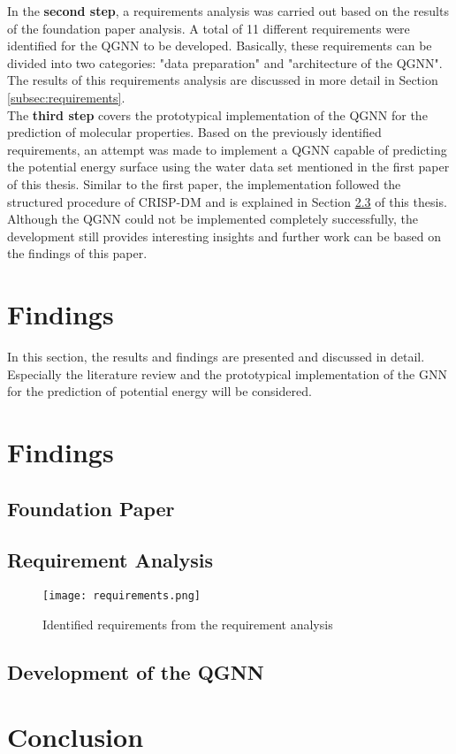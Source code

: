 In the \textbf{second step},  a requirements analysis was carried out based on the results of the foundation paper analysis. A total of 11 different requirements were identified for the QGNN to be developed. Basically, these requirements can be divided into two categories: "data preparation" and "architecture of the QGNN". The results of this requirements analysis are discussed in more detail in Section \ref{subsec:requirements}. \\

The \textbf{third step} covers the prototypical implementation of the QGNN for the prediction of molecular properties. Based on the previously identified requirements, an attempt was made to implement a QGNN capable of predicting the potential energy surface using the water data set mentioned in the first paper of this thesis. Similar to the first paper, the implementation followed the structured procedure of CRISP-DM \cite{wirth2000crisp} and is explained in Section \ref{subsec:qgnndevelopment} of this thesis. Although the QGNN could not be implemented completely successfully, the development still provides interesting insights and further work can be based on the findings of this paper.

\section{Findings}
In this section, the results and findings are presented and discussed in detail. Especially the literature review and the prototypical implementation of the GNN for the prediction of potential energy will be considered. 

\section{Findings}
\subsection{Foundation Paper}
\subsection{Requirement Analysis}
\begin{figure}[h!]
    \centering
    \texttt{[image: requirements.png]}
    \caption[Identified requirements from the requirement analysis]{\label{img:requirements}{Identified requirements from the requirement analysis}}
    \end{figure} 
\label{subsec:requirements}
\subsection{Development of the QGNN}
\label{subsec:qgnndevelopment}

\section{Conclusion}
